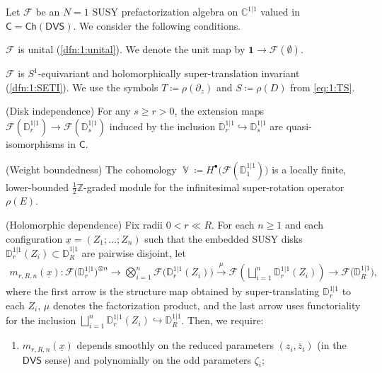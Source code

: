 \documentclass[final,reqno]{amsart}
\numberwithin{equation}{section}
\theoremstyle{definition}
\newcommand{\bl}{\bullet}
\newcommand{\ol}{\overline}
\newcommand{\ul}{\underline}
\newcommand{\ceq}{\coloneqq} %
\newcommand{\xrr}[1]{\xrightarrow{\ #1 \ }{}}
\newcommand{\inj}{\hookrightarrow}
\newcommand{\lto}{\longrightarrow}
\newcommand{\tgen}{\textup{gen}}
\newcommand{\bbC}{\mathbb{C}}
\newcommand{\bbZ}{\mathbb{Z}}
\newcommand{\sC}{\mathbb{C}^{1|1}}
\newcommand{\sD}{\mathbb{D}^{1|1}}
\newcommand{\clF}{\mathcal{F}}
\newcommand{\sfC}{\mathsf{C}}
\newcommand{\Ch}{\mathsf{Ch}}
\newcommand{\DVS}{\mathsf{DVS}}
\newcommand{\pd}{\partial}
\newcommand{\thf}{\tfrac{1}{2}}
\DeclareMathOperator{\bbD}{\mathbb{D}}
\DeclareMathOperator{\bbV}{\mathbb{V}}
\begin{document}
Let $\clF$ be an $N=1$ SUSY prefactorization algebra on $\sC$ 
valued in $\sfC=\Ch(\DVS)$.
We consider the following conditions.
\begin{clist}
\item \label{i:1:u}
$\clF$ is unital (\cref{dfn:1:unital}).
We denote the unit map by $\bm{1} \to \clF(\emptyset)$.

\item \label{i:1:SETI}
$\clF$ is $S^1$-equivariant and holomorphically super-translation invariant 
(\cref{dfn:1:SETI}).
We use the symbols $T\ceq\rho(\pd_z)$ and $S\ceq\rho(D)$ from \eqref{eq:1:TS}.

\item \label{i:1:di}
(Disk independence) 
For any $s \ge r > 0$, the extension maps $\clF(\sD_r) \to \clF(\sD_s)$ 
induced by the inclusion $\sD_r \inj \sD_s$ are quasi-isomorphisms in $\sfC$.

\item \label{i:1:rho(E)}
(Weight boundedness)
The cohomology $\bbV \ceq H^{\bl}\!\bigl(\clF(\sD_1)\bigr)$
is a locally finite, lower-bounded $\thf\bbZ$-graded module for 
the infinitesimal super-rotation operator $\rho(E)$.

\item \label{i:1:hol}
(Holomorphic dependence) 
Fix radii $0<r\ll R$. 
For each $n \ge 1$ and each configuration $\ul{x}=(Z_1;\dots;Z_n)$
such that the embedded SUSY disks $\sD_r(Z_i) \subset \sD_R$ 
are pairwise disjoint, let
\begin{align}\label{eq:1:mrRn}
 m_{r,R,n}(\ul{x})\colon \clF\bigl(\sD_r\bigr)^{\otimes n} \lto 
 \bigotimes_{i=1}^n \clF\bigl(\sD_r(Z_i)\bigr) \xrr{\mu} 
 \clF\left(\bigsqcup_{i=1}^n \sD_r(Z_i)\right)
 \lto \clF\bigl(\sD_R\bigr),
\end{align}
where 
the first arrow is the structure map obtained by 
super-translating $\sD_r$ to each $Z_i$, 
$\mu$ denotes the factorization product, 
and the last arrow uses functoriality for the inclusion 
$\bigsqcup_{i=1}^n\sD_r(Z_i) \inj \sD_R$.
Then, we require:
\begin{enumerate}
\item[(a)] 
$m_{r,R,n}(\ul{x})$ depends smoothly on the reduced parameters $(z_i,\ol{z}_i)$
(in the $\DVS$ sense) and polynomially on the odd parameters $\zeta_i$;


\end{enumerate}
\end{clist}
\end{document}

